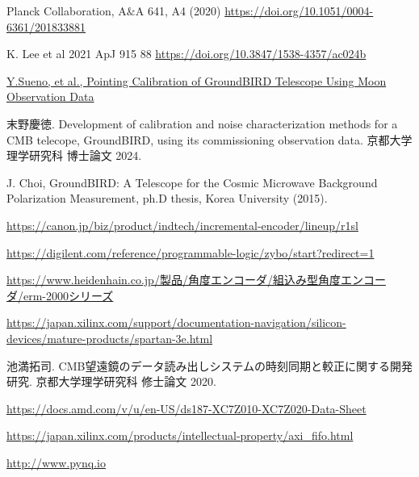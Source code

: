 \begin{thebibliography}{99}
Planck Collaboration, A$\&$A 641, A4 (2020)
\href{https://doi.org/10.1051/0004-6361/201833881}{https://doi.org/10.1051/0004-6361/201833881}

K. Lee et al 2021 ApJ 915 88
\href{https://doi.org/10.3847/1538-4357/ac024b}{https://doi.org/10.3847/1538-4357/ac024b}

\href{https://ui.adsabs.harvard.edu/abs/2024PTEP.2024b3F01S/abstract}
{Y.Sueno, et al., Pointing Calibration of GroundBIRD Telescope Using Moon Observation Data}

末野慶徳. Development of calibration and noise characterization methods for a CMB telecope, GroundBIRD, using its commissioning observation data. 京都大学理学研究科 博士論文 2024.

J. Choi, GroundBIRD: A Telescope for the Cosmic Microwave Background Polarization Measurement, ph.D thesis, Korea University (2015).

\href{https://canon.jp/biz/product/indtech/incremental-encoder/lineup/r1sl}{https://canon.jp/biz/product/indtech/incremental-encoder/lineup/r1sl}

\href{https://digilent.com/reference/programmable-logic/zybo/start?redirect=1}{https://digilent.com/reference/programmable-logic/zybo/start?redirect=1}

\href{https://www.heidenhain.co.jp/製品/角度エンコーダ/組込み型角度エンコーダ/erm-2000シリーズ}{https://www.heidenhain.co.jp/製品/角度エンコーダ/組込み型角度エンコーダ/erm-2000シリーズ}

\href{https://japan.xilinx.com/support/documentation-navigation/silicon-devices/mature-products/spartan-3e.html}{
https://japan.xilinx.com/support/documentation-navigation/silicon-devices/mature-products/spartan-3e.html}

池満拓司. CMB望遠鏡のデータ読み出しシステムの時刻同期と較正に関する開発研究. 京都大学理学研究科 修士論文 2020.

\href{https://docs.amd.com/v/u/en-US/ds187-XC7Z010-XC7Z020-Data-Sheet}{https://docs.amd.com/v/u/en-US/ds187-XC7Z010-XC7Z020-Data-Sheet}

\href{https://japan.xilinx.com/products/intellectual-property/axi\_fifo.html}{https://japan.xilinx.com/products/intellectual-property/axi\_fifo.html}

\href{http://www.pynq.io}{http://www.pynq.io}


\end{thebibliography}
